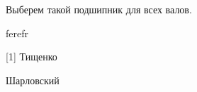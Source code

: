 \documentclass[14pt,a4paper,russian]{scrartcl}
\begin{document}
        Выберем такой подшипник для всех валов.
        

        
        
        
        
        
        
        
        

        
        
\newpage
        ferefr
\renewcommand\refname{Список использованных источников}

        
[1] Тищенко \par
[2] Шарловский
    
\end{document}
